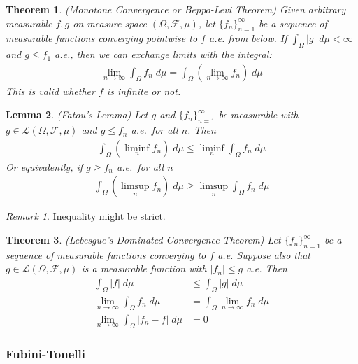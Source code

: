 \documentclass[12pt]{article}
\theoremstyle{plain}
\newtheorem{thm}{Theorem}[section]
\newtheorem{lem}[thm]{Lemma}
\theoremstyle{definition}
\theoremstyle{remark}
\newtheorem*{rmk}{Remark}
\newcommand{\limn}{\lim_{n\rightarrow\infty}}
\newcommand{\sF}{\mathscr{F}}
\newcommand{\sL}{\mathscr{L}}
\newcommand{\ninf}{_{n=1}^\infty}
\begin{document}
\begin{thm}\emph{(Monotone Convergence or Beppo-Levi Theorem)}
Given arbitrary measurable $f,g$ on measure space $(\Omega,\sF,\mu)$,
let $\{f_n\}\ninf$ be a sequence of measurable functions converging
pointwise to $f$ a.e. from below. If $\int_\Omega|g|\;d\mu<\infty$ and
$g \leq f_1$ a.e., then we can exchange limits with the integral:
\begin{align*}
    \lim_{n\rightarrow\infty} \int_\Omega f_n \; d\mu =
    \int_\Omega \left(\lim_{n\rightarrow\infty} f_n\right)
    \; d\mu
\end{align*}
This is valid whether $f$ is infinite or not.
\end{thm}

\begin{lem}\emph{(Fatou's Lemma)}
Let $g$ and $\{f_n\}\ninf$ be measurable with $g\in\sL(\Omega,\sF,\mu)$
and $g \leq f_n$ a.e.\ for all $n$. Then
\begin{align*}
  \int_\Omega \left(\liminf_n f_n\right) \; d\mu
  \leq \liminf_n \int_\Omega f_n \; d\mu
\end{align*}
Or equivalently, if $g \geq f_n$ a.e.\ for all $n$
\begin{align*}
  \int_\Omega \left(\limsup_n f_n\right) \; d\mu
  \geq \limsup_n \int_\Omega f_n \; d\mu
\end{align*}
\end{lem}
\begin{rmk}
Inequality might be strict.
\end{rmk}

\begin{thm}\emph{(Lebesgue's Dominated Convergence Theorem)}
Let $\{f_n\}\ninf$ be a sequence of measurable functions converging to $f$
a.e. Suppose also that $g\in\sL(\Omega,\sF,\mu)$ is a measurable
function with $|f_n|\leq g$ a.e. Then
\begin{align*}
  \int_\Omega |f| \;d\mu
  &\leq
  \int_\Omega |g| \;d\mu \\
  \limn \int_\Omega f_n \; d\mu
  &= \int_\Omega \limn f_n \; d\mu \\
  \limn \int_\Omega |f_n-f|\;d\mu &= 0
\end{align*}
\end{thm}

\subsubsection{Fubini-Tonelli}
\end{document}
